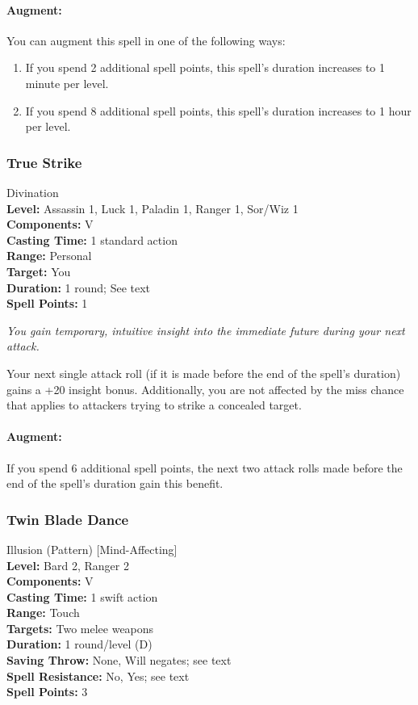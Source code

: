 \paragraph{Augment:} You can augment this spell in one of the following ways:
\begin{enumerate}
 \item If you spend 2 additional spell points, this spell's duration increases to 1 minute per level.
 \item If you spend 8 additional spell points, this spell's duration increases to 1 hour per level.
\end{enumerate}
\subsubsection{True Strike}
\label{Spell:TrueStrike}
Divination
\\ \textbf{Level:} Assassin 1, Luck 1, Paladin 1, Ranger 1, Sor/Wiz 1
\\ \textbf{Components:} V
\\ \textbf{Casting Time:} 1 standard action
\\ \textbf{Range:} Personal
\\ \textbf{Target:} You
\\ \textbf{Duration:} 1 round; See text
\\ \textbf{Spell Points:} 1

\emph{You gain temporary, intuitive insight into the immediate future during your next attack.}

Your next single attack roll (if it is made before the end of the spell's duration) gains a +20 insight bonus. 
Additionally, you are not affected by the miss chance that applies to attackers trying to strike a concealed target.

\paragraph{Augment:} If you spend 6 additional spell points, the next two attack rolls made before the end of the spell's duration gain this benefit.
\subsubsection{Twin Blade Dance}
\label{Spell:TwinBladeDance}
Illusion (Pattern) [Mind-Affecting]
\\ \textbf{Level:} Bard 2, Ranger 2
\\ \textbf{Components:} V
\\ \textbf{Casting Time:} 1 swift action
\\ \textbf{Range:} Touch
\\ \textbf{Targets:} Two melee weapons
\\ \textbf{Duration:} 1 round/level (D)
\\ \textbf{Saving Throw:} None, Will negates; see text
\\ \textbf{Spell Resistance:} No, Yes; see text
\\ \textbf{Spell Points:} 3

